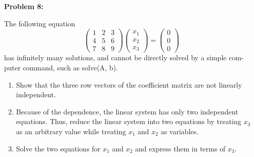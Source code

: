 \documentclass[12pt]{article}
\newenvironment{problem}[1]{
    \textbf{Problem #1:}
}{
    \rmfamily \vspace{1em}
}
\begin{document}
\begin{problem}{8}
    The following equation
    \[
        \begin{pmatrix}
            1 & 2 & 3 \\
            4 & 5 & 6 \\
            7 & 8 & 9
        \end{pmatrix}
        \begin{pmatrix}
            x_1 \\
            x_2 \\
            x_3
        \end{pmatrix}
        =
        \begin{pmatrix}
            0 \\
            0 \\
            0
        \end{pmatrix}
    \]
    has infinitely many solutions, and cannot be directly solved by a simple com-
    puter command, such as solve(A, b).
    \begin{enumerate}[label=(\alph*)]
        \item Show that the three row vectors of the coefficient matrix are not linearly
        independent.
        \item Because of the dependence, the linear system has only two independent
        equations. Thus, reduce the linear system into two equations by treating \(x_3\)
        as an arbitrary value while treating \(x_1\) and \(x_2\) as variables.
        \item Solve the two equations for \(x_1\) and \(x_2\) and express them in terms of \(x_3\).
    \end{enumerate}
\end{problem}
\end{document}
